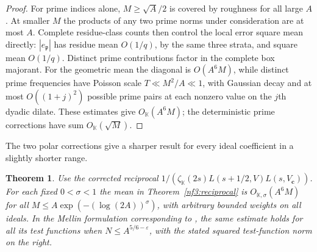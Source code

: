 \documentclass[11pt,letterpaper]{article}
\newtheorem{theorem}{Theorem}[section]
\theoremstyle{definition}
\numberwithin{equation}{section}
\begin{document}
\begin{proof}
For prime indices alone, $M\ge\sqrt A/2$ is covered by roughness
for all large $A$. At smaller $M$ the products of any two prime
norms under consideration are at most $A$. Complete residue-class
counts then control the local error square mean directly:
$|e_{\mathfrak p}|$ has residue mean $O(1/q)$, by the same three
strata, and square mean $O(1/q)$. Distinct prime contributions
factor in the complete box majorant. For the geometric mean the
diagonal is $O(A^6M)$, while distinct prime frequencies have
Poisson scale $T\ll M^2/A\ll1$, with Gaussian decay and at most
$O((1+j)^2)$ possible prime pairs at each nonzero value on the
$j$th dyadic dilate. These estimates give $O_{\mathbb K}(A^6 M)$;
the deterministic prime corrections have sum $O_{\mathbb K}(\sqrt M)$.
\end{proof}

The two polar corrections give a sharper result for every ideal
coefficient in a slightly shorter range.
\begin{theorem}\label{nf3:logfree}
Use the corrected reciprocal
$1/(\zeta_{\mathbb K}(2s)L(s+1/2,V)L(s,V_{\mathbf c}))$.
For each fixed $0<\sigma<1$ the mean in
Theorem~\ref{nf3:reciprocal} is $O_{\mathbb K,\sigma}(A^6M)$
for all $M\le A\exp(-(\log(2A))^\sigma)$, with arbitrary bounded
weights on all ideals. In the Mellin formulation corresponding to
\cite[Conjecture 6.4]{c3:wang}, the same estimate holds for
all its test functions when $N\le A^{5/6-\varepsilon}$, with
the stated squared test-function norm on the right.
\end{theorem}
\end{document}
